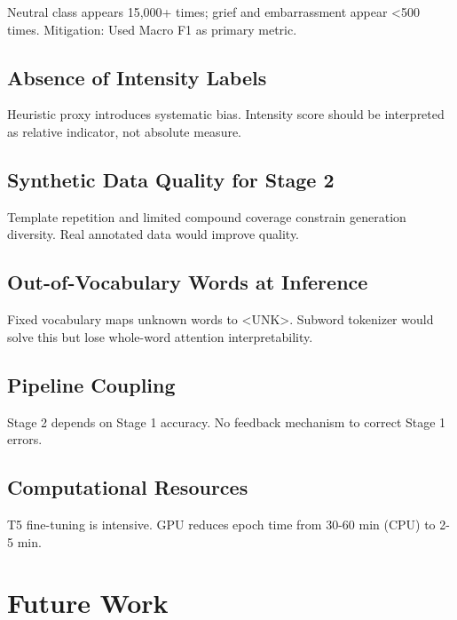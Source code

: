 \documentclass[12pt, a4paper]{report}
\begin{document}
Neutral class appears 15,000+ times; grief and embarrassment appear <500 times. Mitigation: Used Macro F1 as primary metric.

\section{Absence of Intensity Labels}

Heuristic proxy introduces systematic bias. Intensity score should be interpreted as relative indicator, not absolute measure.

\section{Synthetic Data Quality for Stage 2}

Template repetition and limited compound coverage constrain generation diversity. Real annotated data would improve quality.

\section{Out-of-Vocabulary Words at Inference}

Fixed vocabulary maps unknown words to <UNK>. Subword tokenizer would solve this but lose whole-word attention interpretability.

\section{Pipeline Coupling}

Stage 2 depends on Stage 1 accuracy. No feedback mechanism to correct Stage 1 errors.

\section{Computational Resources}

T5 fine-tuning is intensive. GPU reduces epoch time from 30-60 min (CPU) to 2-5 min.

\chapter{Future Work}
\end{document}
